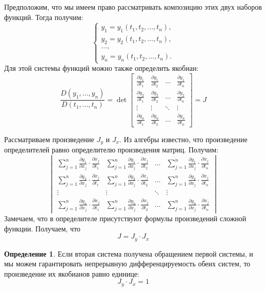 \documentclass{article}
\theoremstyle{plain}
\theoremstyle{definition}
\newtheorem{definition}{Определение}
\theoremstyle{remark}
\begin{document}
Предположим, что мы имеем право рассматривать композицию этих двух наборов функций. Тогда получим:
\begin{equation}
    \begin{cases}
        y_1 = y_1(t_1, t_2, \ldots, t_n), \\
        y_2 = y_2(t_1, t_2, \ldots, t_n), \\
        \ldots, \\
        y_n = y_n(t_1, t_2, \ldots, t_n).
    \end{cases}
\end{equation}
Для этой системы функций можно также определить якобиан:
\begin{equation}
    \frac{D(y_1, \ldots, y_n)}{D(t_1, \ldots, t_n)} = \det \begin{bmatrix}
        \frac{\partial y_1}{\partial t_1} & \frac{\partial y_1}{\partial t_2} & \ldots & \frac{\partial y_1}{\partial t_n} \\
        \frac{\partial y_2}{\partial t_1} & \frac{\partial y_2}{\partial t_2} & \ldots & \frac{\partial y_2}{\partial t_n} \\
        \vdots & \vdots & \ddots & \vdots \\
        \frac{\partial y_n}{\partial t_1} & \frac{\partial y_n}{\partial t_2} & \ldots & \frac{\partial y_n}{\partial t_n}
    \end{bmatrix} = J
\end{equation}

Рассматриваем произведение $J_y$ и $J_x$. Из алгебры известно, что произведение
определителей равно определителю произведения матриц. Получим:
\begin{equation}
    \begin{vmatrix}
        \sum_{j=1}^{n} \frac{\partial y_1}{\partial x_j} \cdot \frac{\partial x_j}{\partial t_1} & \sum_{j=1}^{n} \frac{\partial y_1}{\partial x_j} \cdot \frac{\partial x_j}{\partial t_2} & \ldots & \sum_{j=1}^{n} \frac{\partial y_1}{\partial x_j} \cdot \frac{\partial x_j}{\partial t_n} \\
        \sum_{j=1}^{n} \frac{\partial y_2}{\partial x_j} \cdot \frac{\partial x_j}{\partial t_1} & \sum_{j=1}^{n} \frac{\partial y_2}{\partial x_j} \cdot \frac{\partial x_j}{\partial t_2} & \ldots & \sum_{j=1}^{n} \frac{\partial y_2}{\partial x_j} \cdot \frac{\partial x_j}{\partial t_n} \\
        \vdots & \vdots & \ddots & \vdots \\
        \sum_{j=1}^{n} \frac{\partial y_n}{\partial x_j} \cdot \frac{\partial x_j}{\partial t_1} & \sum_{j=1}^{n} \frac{\partial y_n}{\partial x_j} \cdot \frac{\partial x_j}{\partial t_2} & \ldots & \sum_{j=1}^{n} \frac{\partial y_n}{\partial x_j} \cdot \frac{\partial x_j}{\partial t_n}
    \end{vmatrix}
\end{equation}
Замечаем, что в определителе присутствуют формулы произведений сложной функции. Получаем, что
\begin{equation}
    J = J_y \cdot J_x
\end{equation}

\begin{definition}
{}
Если вторая система получена обращением первой системы, и мы можем
гарантировать непрерывную дифференцируемость обеих систем, то произведение
их якобианов равно единице:
    \begin{equation}
        J_y \cdot J_x = 1
    \end{equation}
\end{definition}
\end{document}
